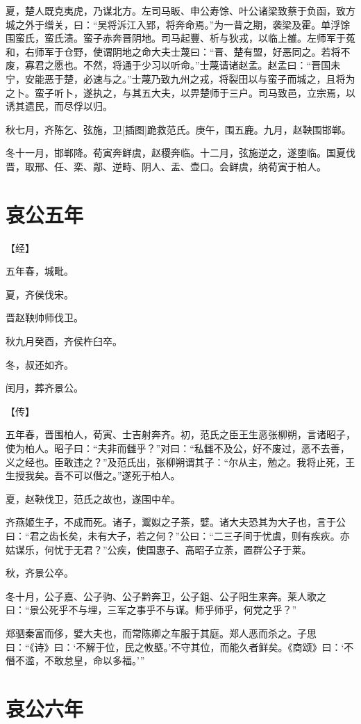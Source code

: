 \documentclass[a4paper,12pt,UTF8,twoside]{ctexbook}
\begin{document}
夏，楚人既克夷虎，乃谋北方。左司马眅、申公寿馀、叶公诸梁致蔡于负函，致方城之外于缯关，曰：“吴将泝江入郢，将奔命焉。”为一昔之期，袭梁及霍。单浮馀围蛮氏，蛮氏溃。蛮子赤奔晋阴地。司马起豐、析与狄戎，以临上雒。左师军于菟和，右师军于仓野，使谓阴地之命大夫士蔑曰：“晋、楚有盟，好恶同之。若将不废，寡君之愿也。不然，将通于少习以听命。”士蔑请诸赵孟。赵孟曰：“晋国未宁，安能恶于楚，必速与之。”士蔑乃致九州之戎，将裂田以与蛮子而城之，且将为之卜。蛮子听卜，遂执之，与其五大夫，以畀楚师于三户。司马致邑，立宗焉，以诱其遗民，而尽俘以归。

秋七月，齐陈乞、弦施，卫[插图]跪救范氏。庚午，围五鹿。九月，赵鞅围邯郸。

冬十一月，邯郸降。荀寅奔鲜虞，赵稷奔临。十二月，弦施逆之，遂堕临。国夏伐晋，取邢、任、栾、鄗、逆畤、阴人、盂、壶口。会鲜虞，纳荀寅于柏人。


\chapter{哀公五年}


【经】

五年春，城毗。

夏，齐侯伐宋。

晋赵鞅帅师伐卫。

秋九月癸酉，齐侯杵臼卒。

冬，叔还如齐。

闰月，葬齐景公。

【传】

五年春，晋围柏人，荀寅、士吉射奔齐。初，范氏之臣王生恶张柳朔，言诸昭子，使为柏人。昭子曰：“夫非而讎乎？”对曰：“私讎不及公，好不废过，恶不去善，义之经也。臣敢违之？”及范氏出，张柳朔谓其子：“尔从主，勉之。我将止死，王生授我矣。吾不可以僭之。”遂死于柏人。

夏，赵鞅伐卫，范氏之故也，遂围中牟。

齐燕姬生子，不成而死。诸子，鬻姒之子荼，嬖。诸大夫恐其为大子也，言于公曰：“君之齿长矣，未有大子，若之何？”公曰：“二三子间于忧虞，则有疾疢。亦姑谋乐，何忧于无君？”公疾，使国惠子、高昭子立荼，置群公子于莱。

秋，齐景公卒。

冬十月，公子嘉、公子驹、公子黔奔卫，公子鉏、公子阳生来奔。莱人歌之曰：“景公死乎不与埋，三军之事乎不与谋。师乎师乎，何党之乎？”

郑驷秦富而侈，嬖大夫也，而常陈卿之车服于其庭。郑人恶而杀之。子思曰：“《诗》曰：‘不解于位，民之攸塈。’不守其位，而能久者鲜矣。《商颂》曰：‘不僭不滥，不敢怠皇，命以多福。’”


\chapter{哀公六年}
\end{document}
